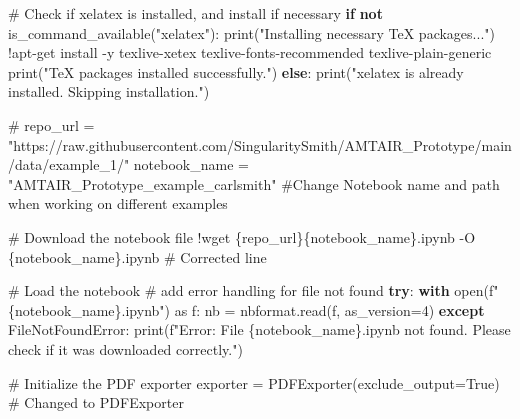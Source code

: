 \documentclass[
  11pt,
  letterpaper,
]{book}
\newenvironment{Shaded}{\begin{snugshade}}{\end{snugshade}}
\newcommand{\BuiltInTok}[1]{\textcolor[rgb]{0.00,0.23,0.31}{#1}}
\newcommand{\CommentTok}[1]{\textcolor[rgb]{0.37,0.37,0.37}{#1}}
\newcommand{\ControlFlowTok}[1]{\textcolor[rgb]{0.00,0.23,0.31}{\textbf{#1}}}
\newcommand{\DecValTok}[1]{\textcolor[rgb]{0.68,0.00,0.00}{#1}}
\newcommand{\ImportTok}[1]{\textcolor[rgb]{0.00,0.46,0.62}{#1}}
\newcommand{\KeywordTok}[1]{\textcolor[rgb]{0.00,0.23,0.31}{\textbf{#1}}}
\newcommand{\NormalTok}[1]{\textcolor[rgb]{0.00,0.23,0.31}{#1}}
\newcommand{\OperatorTok}[1]{\textcolor[rgb]{0.37,0.37,0.37}{#1}}
\newcommand{\PreprocessorTok}[1]{\textcolor[rgb]{0.68,0.00,0.00}{#1}}
\newcommand{\SpecialCharTok}[1]{\textcolor[rgb]{0.37,0.37,0.37}{#1}}
\newcommand{\SpecialStringTok}[1]{\textcolor[rgb]{0.13,0.47,0.30}{#1}}
\newcommand{\StringTok}[1]{\textcolor[rgb]{0.13,0.47,0.30}{#1}}
\newcommand{\VariableTok}[1]{\textcolor[rgb]{0.07,0.07,0.07}{#1}}
\begin{document}
\begin{Shaded}
\begin{Highlighting}[]
\CommentTok{\# Check if xelatex is installed, and install if necessary}
\ControlFlowTok{if} \KeywordTok{not}\NormalTok{ is\_command\_available(}\StringTok{"xelatex"}\NormalTok{):}
    \BuiltInTok{print}\NormalTok{(}\StringTok{"Installing necessary TeX packages..."}\NormalTok{)}
    \OperatorTok{!}\NormalTok{apt}\OperatorTok{{-}}\NormalTok{get install }\OperatorTok{{-}}\NormalTok{y texlive}\OperatorTok{{-}}\NormalTok{xetex texlive}\OperatorTok{{-}}\NormalTok{fonts}\OperatorTok{{-}}\NormalTok{recommended texlive}\OperatorTok{{-}}\NormalTok{plain}\OperatorTok{{-}}\NormalTok{generic}
    \BuiltInTok{print}\NormalTok{(}\StringTok{"TeX packages installed successfully."}\NormalTok{)}
\ControlFlowTok{else}\NormalTok{:}
    \BuiltInTok{print}\NormalTok{(}\StringTok{"xelatex is already installed. Skipping installation."}\NormalTok{)}

\CommentTok{\# repo\_url = "https://raw.githubusercontent.com/SingularitySmith/AMTAIR\_Prototype/main/data/example\_1/"}
\NormalTok{notebook\_name }\OperatorTok{=} \StringTok{"AMTAIR\_Prototype\_example\_carlsmith"}  \CommentTok{\#Change Notebook name and path when working on different examples}

\CommentTok{\# Download the notebook file}
\OperatorTok{!}\NormalTok{wget \{repo\_url\}\{notebook\_name\}.ipynb }\OperatorTok{{-}}\NormalTok{O \{notebook\_name\}.ipynb  }\CommentTok{\# Corrected line}

\CommentTok{\# Load the notebook}
\CommentTok{\# add error handling for file not found}
\ControlFlowTok{try}\NormalTok{:}
  \ControlFlowTok{with} \BuiltInTok{open}\NormalTok{(}\SpecialStringTok{f"}\SpecialCharTok{\{}\NormalTok{notebook\_name}\SpecialCharTok{\}}\SpecialStringTok{.ipynb"}\NormalTok{) }\ImportTok{as}\NormalTok{ f:}
\NormalTok{    nb }\OperatorTok{=}\NormalTok{ nbformat.read(f, as\_version}\OperatorTok{=}\DecValTok{4}\NormalTok{)}
\ControlFlowTok{except} \PreprocessorTok{FileNotFoundError}\NormalTok{:}
  \BuiltInTok{print}\NormalTok{(}\SpecialStringTok{f"Error: File \textquotesingle{}}\SpecialCharTok{\{}\NormalTok{notebook\_name}\SpecialCharTok{\}}\SpecialStringTok{.ipynb\textquotesingle{} not found. Please check if it was downloaded correctly."}\NormalTok{)}


\CommentTok{\# Initialize the PDF exporter}
\NormalTok{exporter }\OperatorTok{=}\NormalTok{ PDFExporter(exclude\_output}\OperatorTok{=}\VariableTok{True}\NormalTok{)  }\CommentTok{\# Changed to PDFExporter}


\end{Highlighting}
\end{Shaded}
\end{document}
